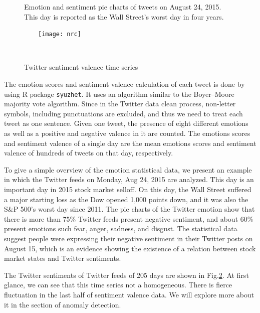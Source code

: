 \documentclass[10pt,letterpaper]{article}
\begin{document}
\begin{figure}[!ht]
    \centering
    \qquad
    \caption{\small Emotion and sentiment pie charts of tweets on August 24, 2015. This day is reported as the Wall Street's worst day in four years.}
    \label{f1}%
\end{figure}


\begin{figure} [!ht]
	\centering
    \texttt{[image: nrc]}
    \caption{\small Twitter sentiment valence time series}
    \label{f2}
\end{figure} 


The emotion scores and sentiment valence calculation of each tweet is done by using R package \texttt{syuzhet}. It uses an algorithm similar to the Boyer–Moore majority vote algorithm. Since in the Twitter data clean process, non-letter symbols, including punctuations are excluded, and thus we need to treat each tweet as one sentence. Given one tweet, the presence of eight different emotions as well as a positive and negative valence in it are counted. The emotions scores and sentiment valence of a single day are the mean emotions scores and sentiment valence of hundreds of tweets on that day, respectively. 

To give a simple overview of the emotion statistical data, we present an example in which the Twitter feeds on Monday, Aug 24, 2015 are analyzed. This day is an important day in 2015 stock market selloff. On this day, the Wall Street suffered a major starting loss as the Dow opened 1,000 points down, and it was also the S\&P 500's worst day since 2011. The pie charts of the Twitter emotion show that there is more than 75\% Twitter feeds present negative sentiment, and about 60\% present emotions such fear, anger, sadness, and disgust. The statistical data suggest people were expressing their negative sentiment in their Twitter posts on August 15, which is an evidence showing the existence of a relation  between stock market states and Twitter sentiments. 

The Twitter sentiments of Twitter feeds of 205 days are shown in Fig.\ref{f2}. At first glance, we can see that this time series not a homogeneous. There is fierce fluctuation in the last half of sentiment valence data. We will explore more about it in the section of anomaly detection. 
\end{document}
